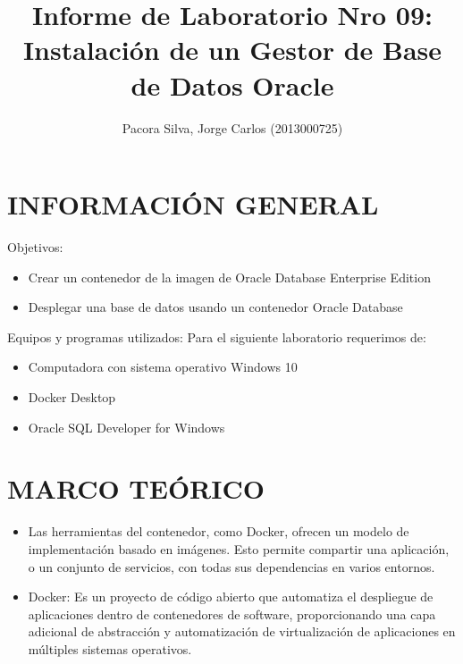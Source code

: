 \documentclass[preprint,12pt]{elsarticle}
\begin{document}
	\begin{frontmatter}
		\title{\huge Informe de Laboratorio Nro 09: Instalación de un Gestor de Base de Datos Oracle}
		\address{Universidad Privada de Tacna}
		\address{Escuela Profesional de Ingeniería de Sistemas}
		\address{Curso : Base de Datos II}		
		\author{Pacora Silva, Jorge Carlos      	(2013000725)}		
		\address{Tacna, Perú}
\end{frontmatter}

\section{INFORMACIÓN GENERAL}
Objetivos:
\begin{itemize}
\item Crear un contenedor de la imagen de Oracle Database Enterprise Edition 
\item Desplegar una base de datos usando un contenedor Oracle Database
\end{itemize}
Equipos y programas utilizados:
Para el siguiente laboratorio requerimos de:
\begin{itemize}
\item Computadora con sistema operativo Windows 10
\item Docker Desktop
\item Oracle SQL Developer for Windows

\end{itemize}

\section{MARCO TEÓRICO}
\begin{itemize}
\item Las herramientas del contenedor, como Docker, ofrecen un modelo de implementación basado en imágenes. Esto permite compartir una aplicación, o un conjunto de servicios, con todas sus dependencias en varios entornos.
\item Docker: Es un proyecto de código abierto que automatiza el despliegue de aplicaciones dentro de contenedores de software, proporcionando una capa adicional de abstracción y automatización de virtualización de aplicaciones en múltiples sistemas operativos.
\end{itemize}
\end{document}

